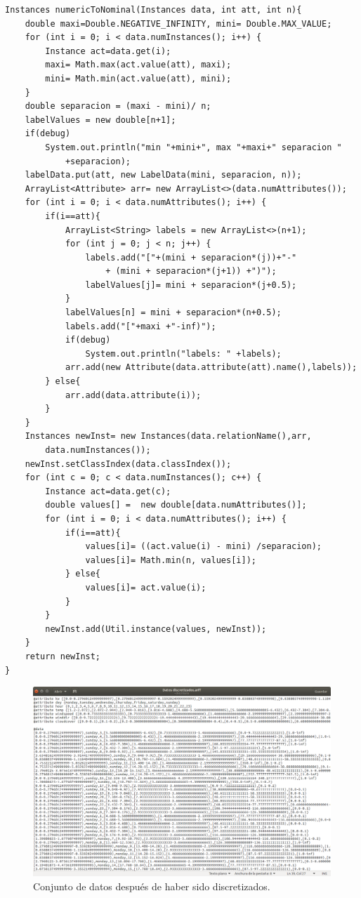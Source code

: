 \begin{lstlisting}[frame=single]  
Instances numericToNominal(Instances data, int att, int n){
	double maxi=Double.NEGATIVE_INFINITY, mini= Double.MAX_VALUE;
	for (int i = 0; i < data.numInstances(); i++) {
		Instance act=data.get(i);
		maxi= Math.max(act.value(att), maxi);
		mini= Math.min(act.value(att), mini);
	}
	double separacion = (maxi - mini)/ n;
	labelValues = new double[n+1];
	if(debug)
		System.out.println("min "+mini+", max "+maxi+" separacion "
			+separacion);
	labelData.put(att, new LabelData(mini, separacion, n));
	ArrayList<Attribute> arr= new ArrayList<>(data.numAttributes());
	for (int i = 0; i < data.numAttributes(); i++) {
		if(i==att){
			ArrayList<String> labels = new ArrayList<>(n+1);
			for (int j = 0; j < n; j++) {
				labels.add("["+(mini + separacion*(j))+"-" 
					+ (mini + separacion*(j+1)) +")");
				labelValues[j]= mini + separacion*(j+0.5);
			}
			labelValues[n] = mini + separacion*(n+0.5);
			labels.add("["+maxi +"-inf)");
			if(debug)
				System.out.println("labels: " +labels);
			arr.add(new Attribute(data.attribute(att).name(),labels));
		} else{
			arr.add(data.attribute(i));
		}
	}
	Instances newInst= new Instances(data.relationName(),arr,
		data.numInstances());
	newInst.setClassIndex(data.classIndex());
	for (int c = 0; c < data.numInstances(); c++) {
		Instance act=data.get(c);
		double values[] =  new double[data.numAttributes()];
		for (int i = 0; i < data.numAttributes(); i++) {
			if(i==att){
				values[i]= ((act.value(i) - mini) /separacion);
				values[i]= Math.min(n, values[i]);
			} else{
				values[i]= act.value(i);
			}
		}
		newInst.add(Util.instance(values, newInst));
	}
	return newInst;
}
\end{lstlisting}

\begin{figure}[!t]
	\centering
	\includegraphics[width=17cm]{img/datosDiscretizados.png}
	\caption{Conjunto de datos después de haber sido discretizados.}
	\label{fig:datosDiscretizados}
\end{figure}

